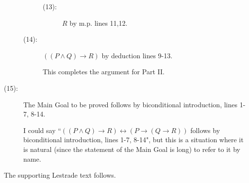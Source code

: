 \documentclass[12pt]{article}
\begin{document}
\begin{description}
\begin{description}
\begin{description}
\item[(13):]  $R$  by m.p. lines 11,12.


\end{description}

\item[(14):]  $((P \wedge Q) \rightarrow R)$ by deduction lines 9-13.

This completes the argument for Part II.

\end{description}

\item[(15):]  The Main Goal to be proved  follows by biconditional introduction, lines 1-7, 8-14.

I could say ``$((P \wedge Q) \rightarrow R) \leftrightarrow (P \rightarrow (Q \rightarrow R))$ follows by biconditional introduction, lines 1-7, 8-14", but this is a situation where it is natural (since the statement of the Main Goal is long) to refer to it by name.

\end{description}

The supporting Lestrade text follows.
\end{document}
